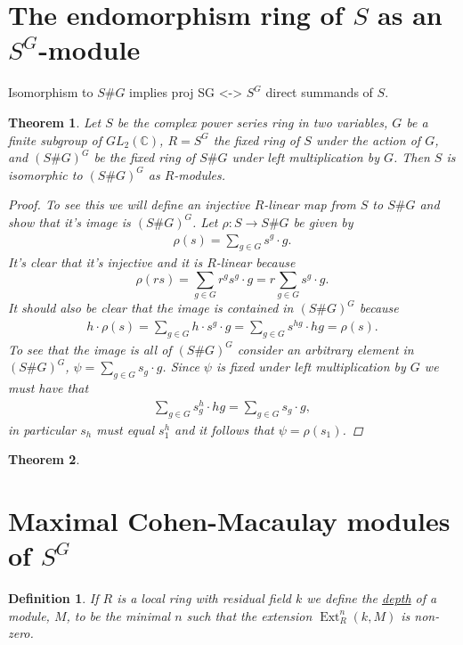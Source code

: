 \documentclass[11pt, a4paper, english]{article}
\numberwithin{prop}{section}
\numberwithin{lemma}{section}
\newtheorem{theorem}{Theorem}
\numberwithin{theorem}{section}
\newtheorem{defin}{Definition}
\numberwithin{defin}{section}
\numberwithin{example}{section}
\newcommand{\C}{\mathbb{C}}
\DeclareMathOperator{\Ext}{Ext}
\begin{document}
\section{The endomorphism ring of $S$ as an $S^G$-module}
Isomorphism to $S\#G$ implies proj SG <-> $S^G$ direct summands of $S$.

\begin{theorem}
Let $S$ be the complex power series ring in two variables, $G$ be a finite subgroup of $GL_2(\C)$, $R = S^G$ the fixed ring of $S$ under the action of $G$, and $(S\#G)^G$ be the fixed ring of $S\#G$ under left multiplication by $G$. Then $S$ is isomorphic to $(S\#G)^G$ as $R$-modules.

\begin{proof}
To see this we will define an injective $R$-linear map from $S$ to $S\#G$ and show that it's image is $(S\#G)^G$. Let $\rho: S \to S\#G$ be given by
\begin{align*}
\rho(s) = \sum_{g \in G} s^g \cdot g.
\end{align*}
It's clear that it's injective and it is $R$-linear because $$\rho(rs) = \sum_{g \in G} r^gs^g \cdot g = r\sum_{g \in G} s^g \cdot g.$$ It should also be clear that the image is contained in $(S\#G)^G$ because
\begin{align*}
h \cdot \rho(s) = \sum_{g \in G} h \cdot s^g \cdot g = \sum_{g \in G} s^{hg} \cdot hg = \rho(s).
\end{align*}
To see that the image is all of $(S\#G)^G$ consider an arbitrary element in $(S\#G)^G$, $\psi = \sum_{g\in G} s_g \cdot g$. Since $\psi$ is fixed under left multiplication by $G$ we must have that
\begin{align*}
\sum_{g\in G} s_g^h \cdot hg = \sum_{g\in G} s_g \cdot g,
\end{align*}
in particular $s_h$ must equal $s_1^h$ and it follows that $\psi = \rho(s_1)$.
\end{proof}
\end{theorem}

\begin{theorem}

\end{theorem}

\section{Maximal Cohen-Macaulay modules of $S^G$}
\begin{defin}
If $R$ is a local ring with residual field $k$ we define the \underline{depth} of a module, $M$, to be the minimal $n$ such that the extension $\Ext^n_R(k, M)$ is non-zero.
\end{defin}
\end{document}
